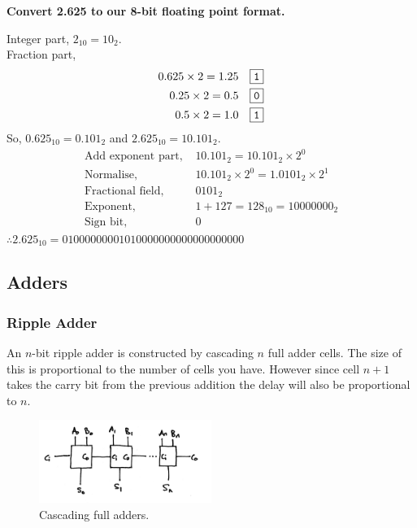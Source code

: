 \begin{framed}
\textbf{Convert 2.625 to our 8-bit floating point format.} \\ \par
Integer part, $2_{10}=10_{2}$. \\
Fraction part, 
\begin{align*}
    0.625\times 2=1.25 \quad \boxed{\mbox{\texttt{1}}} \\
    0.25\times 2=0.5 \quad \boxed{\mbox{\texttt{0}}} \\
    0.5\times 2=1.0 \quad \boxed{\mbox{\texttt{1}}}
\end{align*}
So, $0.625_{10}=0.101_2$ and $2.625_{10}=10.101_2$.
\begin{align*}
    \mbox{Add exponent part, } & 10.101_2 = 10.101_2 \times 2^0 \\
    \mbox{Normalise, } & 10.101_2 \times 2^0 = 1.0101_2 \times 2^1 \\
    \mbox{Fractional field, } & 0101_2 \\
    \mbox{Exponent, } & 1+127=128_{10}=10000000_{2} \\
    \mbox{Sign bit, } & 0
\end{align*}
$\therefore 2.625_{10} = \boxed{0}\boxed{10000000}\boxed{01010000000000000000000}$
\end{framed}

\subsection{Adders}
\subsubsection*{Ripple Adder}
An $n$-bit ripple adder is constructed by cascading $n$ full adder cells. The size of this is proportional to the number of cells you have. However since cell $n+1$ takes the carry bit from the previous addition the delay will also be proportional to $n$.

\begin{figure}[H]
    \centering
    \includegraphics[width=0.5\textwidth]{img/ripple-adder}
    \caption{Cascading full adders.}
\end{figure}

